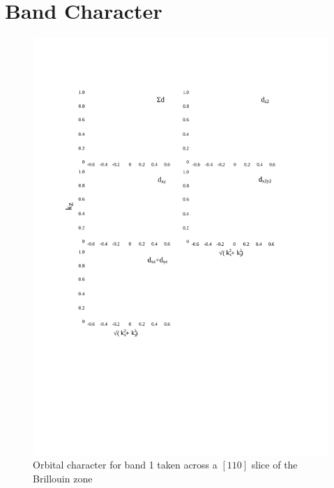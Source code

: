 
\chapter{\BaFeP Band Character}
\label{Appendix:BandCharacter110Slices}

\begin{figure}[h!]
    \begin{center}
        \includegraphics[scale=0.7]{Chapter3-dHvABaFe2P2/Figures/AngleDepMeasurements/BandCharacterPlot/Band1_110Slice_BandCharacter}
        \caption{Orbital character for band 1 taken across a $[110]$ slice of the Brillouin zone}
        \label{Fig:Appendix:BandCharacter110Band1}
    \end{center}
\end{figure}
